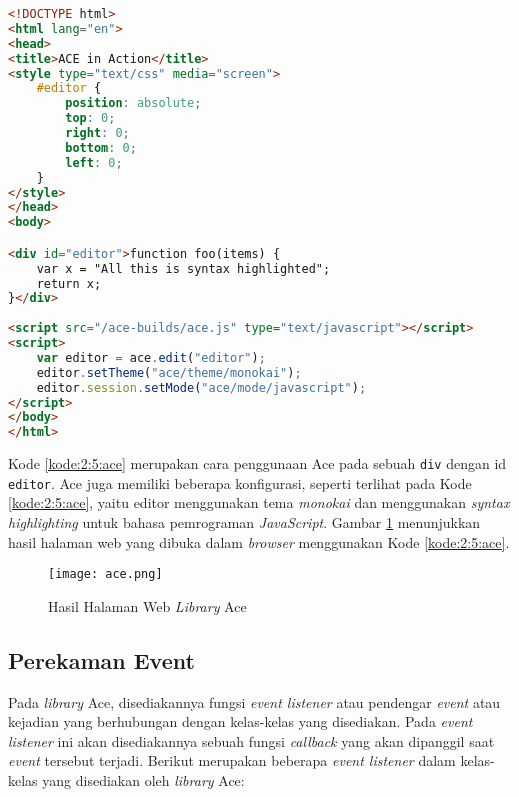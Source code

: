\begin{lstlisting}[language={html}, caption={Contoh kode penggunaan Ace}, label={kode:2:5:ace}]
<!DOCTYPE html>
<html lang="en">
<head>
<title>ACE in Action</title>
<style type="text/css" media="screen">
	#editor { 
		position: absolute;
		top: 0;
		right: 0;
		bottom: 0;
		left: 0;
	}
</style>
</head>
<body>

<div id="editor">function foo(items) {
	var x = "All this is syntax highlighted";
	return x;
}</div>
	
<script src="/ace-builds/ace.js" type="text/javascript"></script>
<script>
	var editor = ace.edit("editor");
	editor.setTheme("ace/theme/monokai");
	editor.session.setMode("ace/mode/javascript");
</script>
</body>
</html>
\end{lstlisting}

Kode \ref{kode:2:5:ace} merupakan cara penggunaan Ace pada sebuah \texttt{div} dengan id \texttt{editor}. Ace juga memiliki beberapa konfigurasi, seperti terlihat pada Kode \ref{kode:2:5:ace}, yaitu editor menggunakan tema \textit{monokai} dan menggunakan \textit{syntax highlighting} untuk bahasa pemrograman \textit{JavaScript}. Gambar \ref{fig:2:5:ace} menunjukkan hasil halaman web yang dibuka dalam \textit{browser} menggunakan Kode \ref{kode:2:5:ace}.

\begin{figure}
	\centering
	\texttt{[image: ace.png]}
	\caption{Hasil Halaman Web \textit{Library} Ace}
	\label{fig:2:5:ace}
\end{figure}

\subsection{Perekaman Event}

Pada \textit{library} Ace, disediakannya fungsi \textit{event listener} atau pendengar \textit{event} atau kejadian yang berhubungan dengan kelas-kelas yang disediakan. Pada \textit{event listener} ini akan disediakannya sebuah fungsi \textit{callback} yang akan dipanggil saat \textit{event} tersebut terjadi. Berikut merupakan beberapa \textit{event listener} dalam kelas-kelas yang disediakan oleh \textit{library} Ace:

